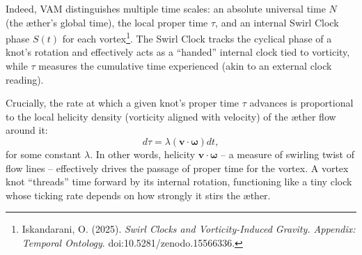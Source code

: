 Indeed, VAM distinguishes multiple time scales: an absolute universal time $N$ (the \ae ther's global time), the local proper time $\tau$, and an internal Swirl Clock phase $S(t)$ for each vortex\footnote{Iskandarani, O. (2025). \textit{Swirl Clocks and Vorticity-Induced Gravity. Appendix: Temporal Ontology}. doi:10.5281/zenodo.15566336.}. The Swirl Clock tracks the cyclical phase of a knot's rotation and effectively acts as a ``handed'' internal clock tied to vorticity, while $\tau$ measures the cumulative time experienced (akin to an external clock reading).

Crucially, the rate at which a given knot's proper time $\tau$ advances is proportional to the local helicity density (vorticity aligned with velocity) of the \ae ther flow around it:
\begin{equation}
d\tau = \lambda (\mathbf{v}\cdot\boldsymbol{\omega}) dt,
\label{eq:helicity-time}
\end{equation}
for some constant $\lambda$. In other words, helicity $\mathbf{v}\cdot\boldsymbol{\omega}$ -- a measure of swirling twist of flow lines -- effectively drives the passage of proper time for the vortex. A vortex knot ``threads'' time forward by its internal rotation, functioning like a tiny clock whose ticking rate depends on how strongly it stirs the \ae ther.
